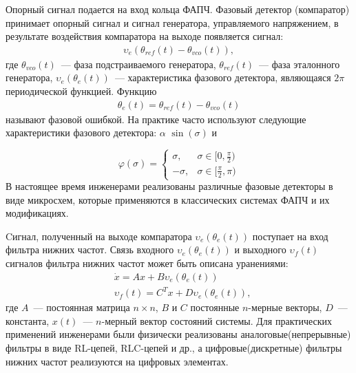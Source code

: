 \documentclass[a4paper,14pt]{article} %
\theoremstyle{cited}
\begin{document}
Опорный сигнал подается на вход кольца ФАПЧ. Фазовый детектор (компаратор) принимает опорный сигнал и сигнал генератора, управляемого напряжением, в результате воздействия компаратора на выходе появляется сигнал:
 \begin{equation*}
 \begin{aligned}
\upsilon_e(\theta_{ref}(t) - \theta_{vco}(t)),
 \end{aligned}
\end{equation*}
где $\theta_{vco}(t)$~--- фаза подстраиваемого генератора, $\theta_{ref}(t)$~--- фаза эталонного генератора, $\upsilon_e(\theta_e(t))$~--- характеристика фазового детектора, являющаяся $2\pi$ периодической функцией. Функцию
 \begin{equation*}
 \begin{aligned}
\theta_e(t) = \theta_{ref}(t) - \theta_{vco}(t)
 \end{aligned}
\end{equation*}
называют фазовой ошибкой. На практике часто используют следующие характеристики фазового детектора: $\alpha$ $\operatorname{sin}(\sigma)$ и 

\begin{equation*}
\varphi(\sigma) = 
 \begin{cases}
   \sigma, &\text{$\sigma \in [0,  \frac{\pi}{2})$}\\
   -\sigma, &\text{$\sigma \in [\frac{\pi}{2},  \pi)$}
 \end{cases}
\end{equation*}
В настоящее время инженерами реализованы различные фазовые детекторы в виде микросхем, которые применяются в классических системах ФАПЧ и их модификациях.

Cигнал, полученный на выходе компаратора $\upsilon_e(\theta_e(t))$ поступает на вход фильтра нижних частот. Связь входного $\upsilon_e(\theta_e(t))$ и выходного $\upsilon_f(t)$ сигналов фильтра нижних частот может быть описана уранениями:
 \begin{equation*}
 \begin{aligned}
&\dot{x} = Ax + B\upsilon_e(\theta_e(t))\\
&\upsilon_f(t) = C^Tx + D\upsilon_e(\theta_e(t)),
 \end{aligned}
\end{equation*}
где $A$~--- постоянная матрица $n \times n$, $B$ и $C$ постоянные $n$-мерные векторы, $D$~--- константа, $x(t)$~--- $n$-мерный вектор состояний системы. Для практических применений инженерами были физически реализованы аналоговые(непрерывные) фильтры в виде RL-цепей, RLC-цепей и др., а цифровые(дискретные) фильтры нижних частот реализуются на цифровых элементах.
\end{document}
